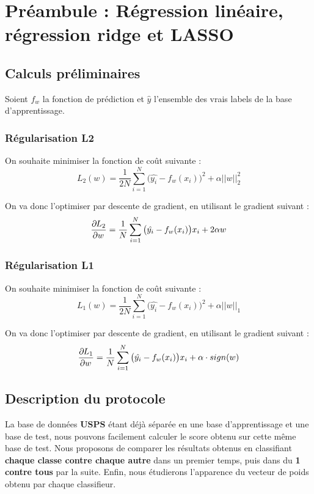 \documentclass[a4paper]{memoir}
\begin{document}
\beginLectureNotes

\newpage
\section{Préambule : Régression linéaire, régression ridge et LASSO}
\subsection{Calculs préliminaires}
Soient $f_w$ la fonction de prédiction et $\hat{y}$ l'ensemble des vrais labels de la base d'apprentissage.


\subsubsection{Régularisation L2}
On souhaite minimiser la fonction de coût suivante :
\begin{equation*}
L_2(w) = \frac{1}{2N} \sum_{i=1}^{N}{\big(\hat{y_i} - f_w(x_i)\big)^2} + \alpha||w||_2^2
\end{equation*}

On va donc l'optimiser par descente de gradient, en utilisant le gradient suivant :
\begin{equation*}
\frac{\partial^{^{}}\! L_2}{\partial w^{^{}}} = \frac{1}{N} \sum_{i=1}^{N}{\big(\hat{y_i} - f_w(x_i)\big)x_i} + 2\alpha w
\end{equation*}


\subsubsection{Régularisation L1}
On souhaite minimiser la fonction de coût suivante :
\begin{equation*}
L_1(w) = \frac{1}{2N} \sum_{i=1}^{N}{\big(\hat{y_i} - f_w(x_i)\big)^2} + \alpha||w||_1
\end{equation*}

On va donc l'optimiser par descente de gradient, en utilisant le gradient suivant :
\begin{equation*}
\frac{\partial^{^{}}\! L_1}{\partial w^{^{}}} = \frac{1}{N} \sum_{i=1}^{N}{\big(\hat{y_i} - f_w(x_i)\big)x_i} + \alpha \cdot sign(w)
\end{equation*}


\subsection{Description du protocole}
La base de données \textbf{USPS} étant déjà séparée en une base d'apprentissage et une base de test, nous pouvons facilement calculer le score obtenu sur cette même base de test. Nous proposons de comparer les résultats obtenus en classifiant \textbf{chaque classe contre chaque autre} dans un premier temps, puis dans du \textbf{1 contre tous} par la suite. Enfin, nous étudierons l'apparence du vecteur de poids obtenu par chaque classifieur.
\end{document}
